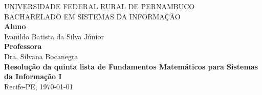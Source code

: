 \documentclass[12pt]{article}
\begin{document}
\begin{titlepage}
\centering
 \vfill
  \begin{center}


   {\large {UNIVERSIDADE FEDERAL RURAL DE PERNAMBUCO \\
BACHARELADO EM SISTEMAS DA INFORMAÇÃO
}}\\[4cm]

   {\large {\textbf{Aluno} \\
   Ivanildo Batista da Silva Júnior
   }}\\[.5cm]
   
   {\large {\textbf{Professora}\\ Dra. Silvana Bocanegra}}\\[3cm]
   {\large \textbf{Resolução da quinta lista de Fundamentos Matemáticos para Sistemas da Informação I}}\\[10.5cm] 
   
\normalsize {Recife-PE, \today}
\newpage

  \vfill
\end{center}
\end{titlepage}


\newpage

\tableofcontents
\thispagestyle{empty}
\newpage

\newpage
\setcounter{page}{1}
\end{document}
